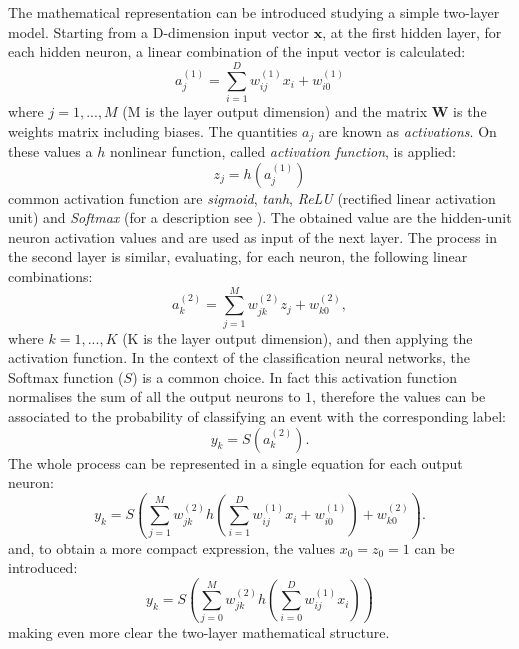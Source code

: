 The mathematical representation can be introduced studying a simple two-layer model. Starting from a D-dimension input vector $\bm{x}$, at the first hidden layer, for each hidden neuron, a linear combination of the input vector is calculated:
\begin{equation}
    a_j^{(1)} = \sum_{i=1}^D w_{ij}^{(1)} x_i + w_{i0}^{(1)}
\end{equation}
where $j = 1,..., M$ (M is the layer output dimension) and the matrix $\bm{W}$ is the weights matrix including biases. The quantities $a_j$ are known as \textit{activations}. On these values a $h$ nonlinear function, called \textit{activation function}, is applied:
\begin{equation}
    z_j = h(a_j^{(1)})
\end{equation}
common activation function are \textit{sigmoid}, \textit{tanh}, \textit{ReLU} (rectified linear activation unit) and \textit{Softmax} (for a description see \cite{keras_activation}). 
The obtained value are the hidden-unit neuron activation values and are used as input of the next layer. The process in the second layer is similar, evaluating, for each neuron, the following linear combinations:
\begin{equation}
    a_k^{(2)} = \sum_{j=1}^M w_{jk}^{(2)} z_j + w_{k0}^{(2)},
\end{equation}
where $k = 1,..., K$ (K is the layer output dimension), and then applying the activation function. 
In the context of the classification neural networks, the Softmax function ($S$) is a common choice. In fact this activation function normalises the sum of all the output neurons to $1$, therefore the values can be associated to the probability of classifying an event with the corresponding label:
\begin{equation}
    y_k = S(a_k^{(2)}).
\end{equation}
The whole process can be represented in a single equation for each output neuron:
\begin{equation}
    y_k = S\left(\sum_{j=1}^M w_{jk}^{(2)} h\left(\sum_{i=1}^D w_{ij}^{(1)} x_i + w_{i0}^{(1)}\right) + w_{k0}^{(2)}\right).
\end{equation}
and, to obtain a more compact expression, the values $x_0=z_0=1$ can be introduced:
\begin{equation}
    y_k = S\left(\sum_{j=0}^M w_{jk}^{(2)} h\left(\sum_{i=0}^D w_{ij}^{(1)} x_i \right) \right)
\end{equation}
making even more clear the two-layer mathematical structure.\\


